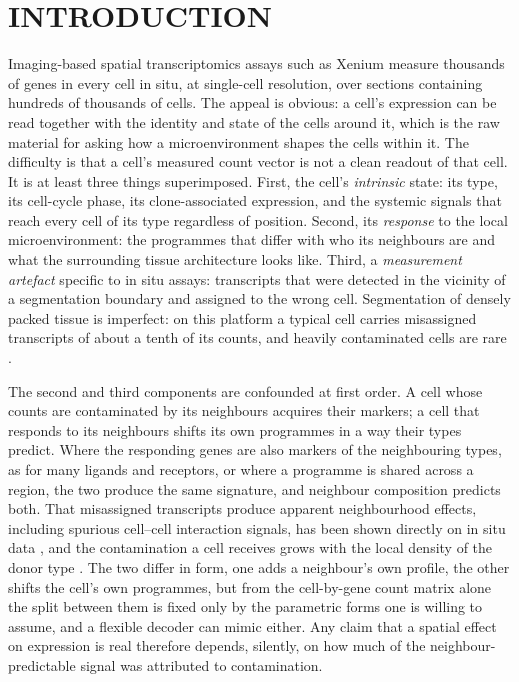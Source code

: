 \section{INTRODUCTION}
\label{sec:intro}

Imaging-based spatial transcriptomics assays such as Xenium \citep{janesick2023} measure thousands of genes in every cell in situ, at single-cell resolution, over sections containing hundreds of thousands of cells. The appeal is obvious: a cell's expression can be read together with the identity and state of the cells around it, which is the raw material for asking how a microenvironment shapes the cells within it. The difficulty is that a cell's measured count vector is not a clean readout of that cell. It is at least three things superimposed. First, the cell's \emph{intrinsic} state: its type, its cell-cycle phase, its clone-associated expression, and the systemic signals that reach every cell of its type regardless of position. Second, its \emph{response} to the local microenvironment: the programmes that differ with who its neighbours are and what the surrounding tissue architecture looks like. Third, a \emph{measurement artefact} specific to in situ assays: transcripts that were detected in the vicinity of a segmentation boundary and assigned to the wrong cell. Segmentation of densely packed tissue is imperfect: on this platform a typical cell carries misassigned transcripts of about a tenth of its counts, and heavily contaminated cells are rare \citep{yang2025mistic}.

The second and third components are confounded at first order. A cell whose counts are contaminated by its neighbours acquires their markers; a cell that responds to its neighbours shifts its own programmes in a way their types predict. Where the responding genes are also markers of the neighbouring types, as for many ligands and receptors, or where a programme is shared across a region, the two produce the same signature, and neighbour composition predicts both. That misassigned transcripts produce apparent neighbourhood effects, including spurious cell--cell interaction signals, has been shown directly on in situ data \citep{mitchel2026celladmix}, and the contamination a cell receives grows with the local density of the donor type \citep{bilous2026split}. The two differ in form, one adds a neighbour's own profile, the other shifts the cell's own programmes, but from the cell-by-gene count matrix alone the split between them is fixed only by the parametric forms one is willing to assume, and a flexible decoder can mimic either. Any claim that a spatial effect on expression is real therefore depends, silently, on how much of the neighbour-predictable signal was attributed to contamination.

